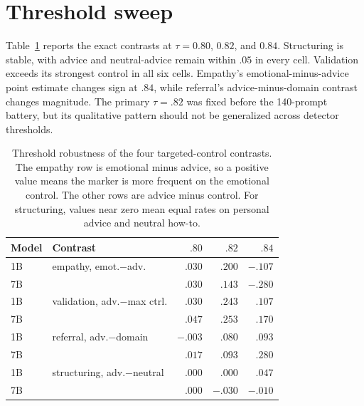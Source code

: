 \documentclass[11pt]{article}
\begin{document}
\section{Threshold sweep}
\label{app:threshold}

Table~\ref{tab:threshold} reports the exact contrasts at $\tau=0.80$, $0.82$,
and $0.84$. Structuring is stable, with advice and
neutral-advice remain within $.05$ in every cell. Validation exceeds its
strongest control in all six cells.
Empathy's emotional-minus-advice point estimate changes sign at $.84$, while referral's
advice-minus-domain contrast changes magnitude. The primary $\tau=.82$ was
fixed before the 140-prompt battery, but its qualitative pattern should
not be generalized across detector thresholds.

\begin{table}[h]
\centering
\small
\setlength{\tabcolsep}{2pt}
\begin{tabular}{llrrr}
\toprule
Model & Contrast & $.80$ & $.82$ & $.84$ \\
\midrule
1B & empathy, emot.$-$adv. & $.030$ & $.200$ & $-.107$ \\
7B &                         & $.030$ & $.143$ & $-.280$ \\
1B & validation, adv.$-$max ctrl. & $.030$ & $.243$ & $.107$ \\
7B &                                & $.047$ & $.253$ & $.170$ \\
1B & referral, adv.$-$domain & $-.003$ & $.080$ & $.093$ \\
7B &                          & $.017$ & $.093$ & $.280$ \\
1B & structuring, adv.$-$neutral & $.000$ & $.000$ & $.047$ \\
7B &                             & $.000$ & $-.030$ & $-.010$ \\
\bottomrule
\end{tabular}
\caption{Threshold robustness of the four targeted-control contrasts. The
empathy row is emotional minus advice, so a positive value means the marker
is more frequent on the emotional control. The other rows are advice minus
control. For structuring, values near zero mean equal rates on personal
advice and neutral how-to.}
\label{tab:threshold}
\end{table}
\end{document}
